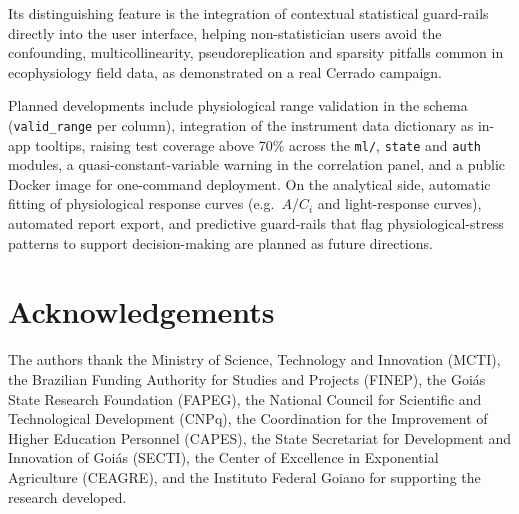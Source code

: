 \documentclass[preprint,12pt,a4paper]{elsarticle}
\begin{document}
Its distinguishing feature is the integration of contextual statistical guard-rails directly into the user interface, helping non-statistician users avoid the confounding, multicollinearity, pseudoreplication and sparsity pitfalls common in ecophysiology field data, as demonstrated on a real Cerrado campaign.

Planned developments include physiological range validation in the schema (\texttt{valid\_range} per column), integration of the instrument data dictionary as in-app tooltips, raising test coverage above 70\% across the \texttt{ml/}, \texttt{state} and \texttt{auth} modules, a quasi-constant-variable warning in the correlation panel, and a public Docker image for one-command deployment. On the analytical side, automatic fitting of physiological response curves (e.g.\ $A$/$C_i$ and light-response curves), automated report export, and predictive guard-rails that flag physiological-stress patterns to support decision-making are planned as future directions.

\section*{Acknowledgements}

The authors thank the Ministry of Science, Technology and Innovation (MCTI), the Brazilian Funding Authority for Studies and Projects (FINEP), the Goi\'as State Research Foundation (FAPEG), the National Council for Scientific and Technological Development (CNPq), the Coordination for the Improvement of Higher Education Personnel (CAPES), the State Secretariat for Development and Innovation of Goi\'as (SECTI), the Center of Excellence in Exponential Agriculture (CEAGRE), and the Instituto Federal Goiano for supporting the research developed.



\end{document}
